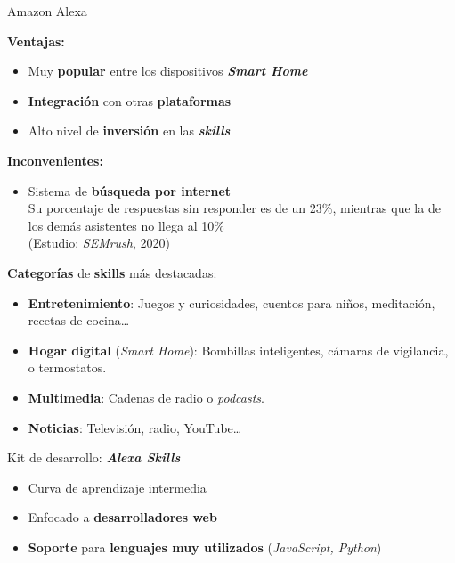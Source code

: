 \documentclass{beamer}
\begin{document}
  \begin{frame}[label=amazon-alexa]{ Amazon Alexa}
    {
      \textbf{Ventajas:}
      \vspace{1.5em}
      \begin{itemize}
        \setlength\itemsep{1.5em}
        \item Muy \textbf{popular} entre los dispositivos \textbf{\textit{Smart Home}}
        \item \textbf{Integración} con otras \textbf{plataformas}
        \item Alto nivel de \textbf{inversión} en las \textbf{\emph{skills}}
      \end{itemize}
    }
    {
      \textbf{Inconvenientes:}
      \vspace{1.5em}
      \begin{itemize}
        \item Sistema de \textbf{búsqueda por internet}\\
        \vspace{.5em}
        {\small Su porcentaje de respuestas sin responder es de un 23\%, mientras que la de los demás asistentes no llega al 10\%}\\
        \vspace{.3em}
        {\footnotesize(Estudio: \textit{SEMrush}, 2020)}
      \end{itemize}
    }
    {
      \textbf{Categorías} de \textbf{skills} más destacadas:
      \vspace{1.5em}
      \begin{itemize}
        \setlength\itemsep{1.5em}
        \item \textbf{Entretenimiento}: Juegos y curiosidades, cuentos para niños, meditación, recetas de cocina\dots
        \item \textbf{Hogar digital} (\textit{Smart Home}): Bombillas inteligentes, cámaras de vigilancia, o termostatos.
        \item \textbf{Multimedia}: Cadenas de radio o \textit{podcasts}.
        \item \textbf{Noticias}: Televisión, radio, YouTube\dots
     \end{itemize}
    }
    {
      Kit de desarrollo: \textbf{\emph{Alexa Skills}}
      \vspace{.7em}
      \begin{itemize}
        \setlength\itemsep{1.5em}
        \item Curva de aprendizaje intermedia
        \item Enfocado a \textbf{desarrolladores web}
        \item \textbf{Soporte} para \textbf{lenguajes muy utilizados} (\emph{JavaScript, Python})
      \end{itemize}
    }
  \end{frame}
\end{document}
